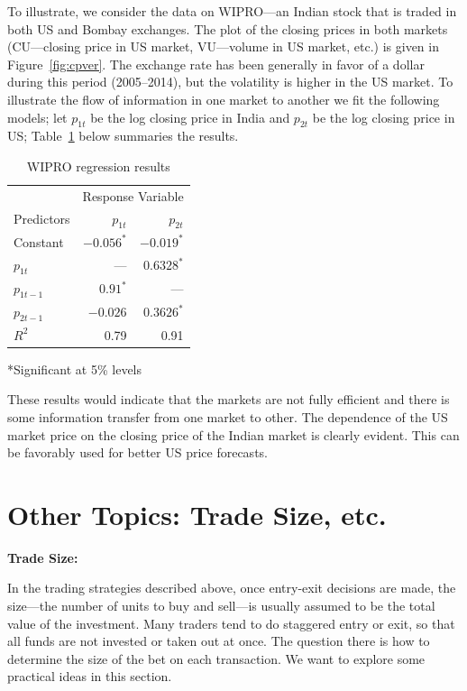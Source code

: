 To illustrate, we consider the data on WIPRO---an Indian stock that is traded in both US and Bombay exchanges. The plot of the closing prices in both markets (CU---closing price in US market, VU---volume in US market, etc.) is given in Figure~\ref{fig:cpver}. The exchange rate has been generally in favor of a dollar during this period (2005--2014), but the volatility is higher in the US market. To illustrate the flow of information in one market to another we fit the following models; let $p_{1t}$ be the log closing price in India and $p_{2t}$ be the log closing price in US; Table~\ref{tab:regresul} below summaries the results.
	\begin{table}[!ht] 
	\caption{WIPRO regression results \label{tab:regresul}}
	\centering
	\begin{tabular}{l|rr} 
	& \multicolumn{2}{c}{Response Variable} \\ 
	Predictors & $p_{1t}$ & $p_{2t}$ \\ \hline 
	Constant & $-0.056^*$ & $-0.019^*$ \\
	$p_{1t}$ & ---  & $0.6328^*$ \\
	$p_{1t-1}$ & $0.91^*$ & --- \\
	$p_{2t-1}$ & $-0.026$ & $0.3626^*$ \\ \hline
	$R^2$ & 0.79 & 0.91 
	\end{tabular} \par
	*Significant at 5\% levels
	\end{table}
These results would indicate that the markets are not fully efficient and there is some information transfer from one market to other. The dependence of the US market price on the closing price of the Indian market is clearly evident. This can be favorably used for better US price forecasts. 



\section{Other Topics: Trade Size, etc.}

\noindent \textbf{Trade Size:} \label{in:tradesize} \twomedskip

In the trading strategies described above, once entry-exit decisions are made, the size---the number of units to buy and sell---is usually assumed to be the total value of the investment. Many traders tend to do staggered entry or exit, so that all funds are not invested or taken out at once. The question there is how to determine the size of the bet on each transaction. We want to explore some practical ideas in this section. 


